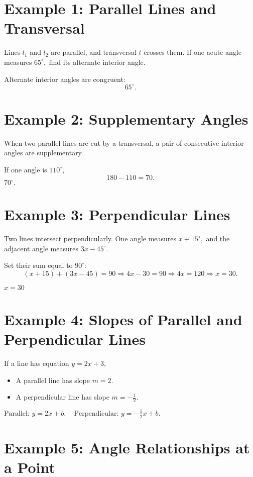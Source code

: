 \documentclass[12pt]{article}
\begin{document}
\section*{Example 1: Parallel Lines and Transversal}

Lines \(l_1\) and \(l_2\) are parallel, and transversal \(t\) crosses them.  
If one acute angle measures \(65^\circ,\) find its alternate interior angle.

Alternate interior angles are congruent:
\[
\boxed{65^\circ.}
\]

\section*{Example 2: Supplementary Angles}

When two parallel lines are cut by a transversal, a pair of consecutive interior angles are supplementary.

If one angle is \(110^\circ,\)
\[
180 - 110 = 70.
\]
\(\boxed{70^\circ.}\)

\section*{Example 3: Perpendicular Lines}

Two lines intersect perpendicularly. One angle measures \(x + 15^\circ,\) and the adjacent angle measures \(3x - 45^\circ.\)

Set their sum equal to \(90^\circ:\)
\[
(x + 15) + (3x - 45) = 90 \Rightarrow 4x - 30 = 90 \Rightarrow 4x = 120 \Rightarrow x = 30.
\]

\(\boxed{x = 30}\)

\section*{Example 4: Slopes of Parallel and Perpendicular Lines}

If a line has equation \(y = 2x + 3,\)
\begin{itemize}
  \item A parallel line has slope \(m = 2.\)
  \item A perpendicular line has slope \(m = -\frac{1}{2}.\)
\end{itemize}

\(\boxed{\text{Parallel: } y = 2x + b, \quad \text{Perpendicular: } y = -\tfrac{1}{2}x + b.}\)

\section*{Example 5: Angle Relationships at a Point}
\end{document}

